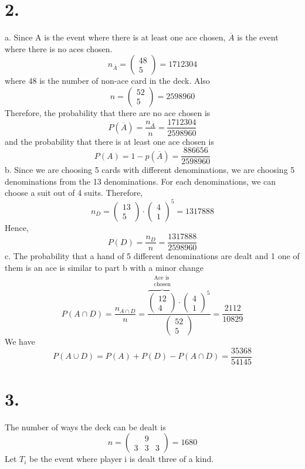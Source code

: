\documentclass[11pt]{article}
\begin{document}
\section*{2.}
a.
Since A is the event where there is at least one ace chosen, $\overline{A}$ is the event where there is no aces chosen.
\[
n_{\overline{A}}= 
\begin{pmatrix}
48 \\
5
\end{pmatrix} 
= 1712304
\] where 48 is the number of non-ace card in the deck. Also
\[n=
\begin{pmatrix}
52 \\
5
\end{pmatrix}
= 2598960
\]
Therefore, the probability that there are no ace chosen is
\[
P(\overline{A}) = 
\frac{n_{\overline{A}}}{n} =
\frac{1712304}{2598960}
\]
and the probability that there is at least one ace chosen is 
\[
P(A) = 1 - p(\overline{A}) = \frac{886656}{2598960}
\]
b.
Since we are choosing 5 cards with different denominations, we are choosing 5 denominations from the 13 denominations. For each denominations, we can choose a suit out of 4 suits. Therefore,
\[n_D = 
\begin{pmatrix}
13 \\
5
\end{pmatrix}
\cdot
\begin{pmatrix}
4 \\
1
\end{pmatrix}^5= 1317888
\]
Hence, 
\[
P(D) = 
\frac{n_D}{n} =
\frac{1317888}{2598960}
\]
c.
The probability that a hand of 5 different denominations are dealt and 1 one of them is an ace is similar to part b with a minor change\\
\[
P(A\cap D) = 
\frac{n_{A \cap D}}{n} =
\frac{
\overbrace{
\begin{pmatrix}
12\\
4
\end{pmatrix}
}^{\substack{\text{Ace is} \\ \text{chosen}}
}
\cdot
\begin{pmatrix}
4 \\
1
\end{pmatrix}^5}
{\begin{pmatrix}
52 \\
5
\end{pmatrix}} 
= \frac{2112}{10829}
\]
We have 
\[
P(A\cup D)  = P(A)+P(D)-P(A\cap D) = \frac{35368}{54145}
\]
\pagebreak
\section*{3.}
The number of ways the deck can be dealt is 
\[
n =
\begin{pmatrix}
&9\\
3 & 3 & 3
\end{pmatrix}
= 1680
\]
Let $T_i$ be the event where player i is dealt three of a kind.
\end{document}
